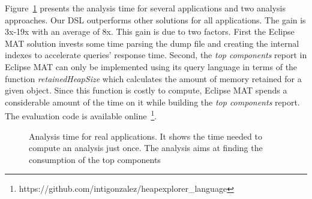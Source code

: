 Figure~\ref{fig:analysisTime} presents the analysis time for several applications and two analysis approaches.
Our DSL outperforms other solutions for all applications.
The gain is 3x-19x with an average of 8x.
This gain is due to two factors.
First the Eclipse MAT solution invests some time parsing the dump file and creating the internal indexes to accelerate queries' response time.
Second, the \textit{top components} report in Eclipse MAT can only be implemented using its query language in terms of the function \textit{retainedHeapSize} which calculates the amount of memory retained for a given object.
Since this function is costly to compute, Eclipse MAT spends a considerable amount of the time on it while building the \textit{top components} report. The evaluation code is available online~\footnote{https://github.com/intigonzalez/heapexplorer\_language}.

\begin{figure}[!b]
\centering
{}
\caption{Analysis time for real applications. It shows the time needed to compute an analysis just once. The analysis aims at finding the consumption of the top components\label{fig:analysisTime}}
\end{figure}

